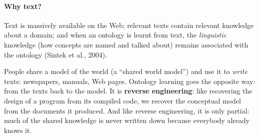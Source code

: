 \paragraph{Why text?}
Text is massively available on the Web; relevant texts contain relevant knowledge about a
domain; and when an ontology is learnt from text, the \emph{linguistic} knowledge (how
concepts are named and talked about) remains associated with the ontology (Sintek et
al., 2004).

\begin{nbintuition}
People share a model of the world (a ``shared world model'') and use it to
\emph{write} texts: newspapers, manuals, Web pages. Ontology learning goes the opposite
way: from the texts back to the model. It is \textbf{reverse engineering}: like
recovering the design of a program from its compiled code, we recover the conceptual
model from the documents it produced. And like reverse engineering, it is only partial:
much of the shared knowledge is never written down because everybody already knows it.
\end{nbintuition}

\begin{center}
\label{fig:layer-cake}
\end{center}

